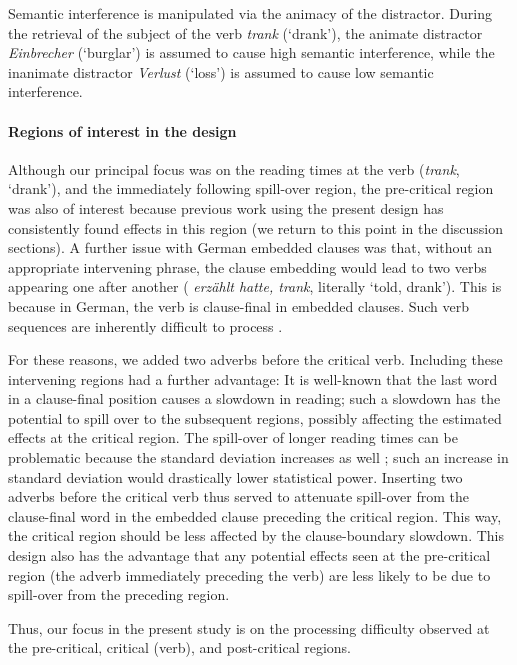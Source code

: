\documentclass[a4paper, man, floatsintext]{apa7}
\begin{document}
Semantic interference is manipulated via the animacy of the distractor. During the retrieval of the subject of the verb \textit{trank} (`drank'), the animate distractor  \textit{Einbrecher} (`burglar') is assumed to cause high semantic interference, while the inanimate distractor \textit{Verlust} (`loss') is assumed to cause low semantic interference. 

\paragraph{Regions of interest in the design}

Although our principal focus was on the reading times at the verb (\textit{trank}, `drank'), and the immediately following spill-over region, the pre-critical region was also of interest because previous work using the present design \parencite{vandyke07,mertzen} has consistently found effects in this region (we return to this point in the discussion sections). A further issue with German embedded clauses \parencite[also see][]{mertzen} was that, without an appropriate intervening phrase, the clause embedding would lead to two verbs appearing one after another ( \textit{erzählt hatte, trank}, literally `told, drank'). This is because in German, the verb is clause-final in embedded clauses. Such verb sequences are inherently difficult to process \parencite{VSLK11,bach1986crossed}. 

For these reasons, we added two adverbs before the critical verb. Including these intervening regions had a further advantage: 
It is well-known \parencite[e.g., ][]{rayner2000effect} that the last word in a clause-final position causes a slowdown in reading; such a slowdown has the potential to spill over to the subsequent regions, possibly affecting the estimated effects at the critical region. The spill-over of longer reading times can be problematic because the standard deviation increases as well \parencite{wagenmakers2007linear}; such an increase in standard deviation would drastically lower statistical power. 
Inserting two adverbs before the critical verb thus served to attenuate spill-over from the clause-final word in the embedded clause preceding the critical region. This way, the critical region should be less affected by the clause-boundary slowdown. This design also has the advantage that any potential effects seen at the pre-critical region (the adverb immediately preceding the verb) are less likely to be due to spill-over from the preceding region. 

Thus, our focus in the present study is on the processing difficulty observed at the pre-critical, critical (verb), and post-critical regions.
\end{document}
